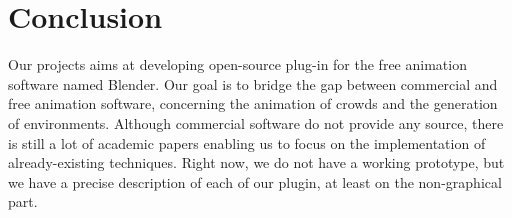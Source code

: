 \section{Conclusion}

Our projects aims at developing open-source plug-in for the free animation software named Blender. Our goal is to bridge the gap between commercial and free animation software, concerning the animation of crowds and the generation of environments. Although commercial software do not provide any source, there is still a lot of academic papers enabling us to focus on the implementation of already-existing techniques. Right now, we do not have a working prototype, but we have a precise description of each of our plugin, at least on the non-graphical part. 
